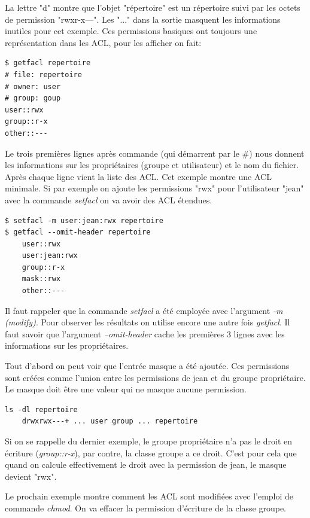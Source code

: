 \documentclass{article}
\begin{document}
La lettre "d" montre que l'objet "répertoire" est un répertoire suivi par les octets de permission "rwxr-x---". Les "..." dans la sortie masquent les informations inutiles pour cet exemple. Ces permissions basiques ont toujours une représentation dans les ACL, pour les afficher on fait:

\begin{verbatim}
$ getfacl repertoire
# file: repertoire 
# owner: user 
# group: goup
user::rwx
group::r-x
other::---
\end{verbatim}

Le trois premières lignes après commande (qui démarrent par le \#) nous donnent les informations sur les propriétaires (groupe et utilisateur) et le nom du fichier. Après chaque ligne vient la liste des ACL. Cet exemple montre une ACL minimale. Si par exemple on ajoute les permissions "rwx" pour l'utilisateur "jean" avec la commande \emph{setfacl} on va avoir des ACL étendues.

\begin{verbatim}
$ setfacl -m user:jean:rwx repertoire
$ getfacl --omit-header repertoire 
	user::rwx 
	user:jean:rwx	
	group::r-x 
	mask::rwx 
	other::---
\end{verbatim}

Il faut rappeler que la commande \emph{setfacl} a été employée avec l'argument \emph{-m (modify)}. Pour observer les résultats on utilise encore une autre fois \emph{getfacl}. Il faut savoir que l'argument \emph{--omit-header} cache les premières 3 lignes avec les informations sur les propriétaires.  

Tout d'abord on peut voir que l'entrée masque a été ajoutée. Ces permissions sont créées comme l'union entre les permissions de jean et du groupe propriétaire. Le masque doit être une valeur qui ne masque aucune permission.  

\begin{verbatim}
ls -dl repertoire
	drwxrwx---+ ... user group ... repertoire
\end{verbatim}

Si on se rappelle du dernier exemple, le groupe propriétaire n'a pas le droit en écriture (\emph{group::r-x}), par contre, la classe groupe a ce droit. C'est pour cela que quand on calcule effectivement le droit avec la permission de jean, le masque devient "rwx".

Le prochain exemple montre comment les ACL sont modifiées avec l'emploi de commande \emph{chmod}. On va effacer la permission d'écriture de la classe groupe.
\end{document}
